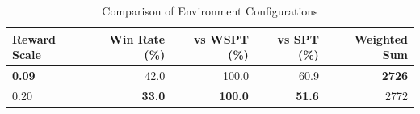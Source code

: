 \begin{table}[htbp]%
\centering%
\begin{tabular}{lrrrr}%
\toprule%
\textbf{Reward Scale}&\textbf{Win Rate (\%)}&\textbf{vs WSPT (\%)}&\textbf{vs SPT (\%)}&\textbf{Weighted Sum}\\%
\midrule%
\textbf{0.09}&42.0&100.0&60.9&\textbf{2726}\\%
0.20&\textbf{33.0}&\textbf{100.0}&\textbf{51.6}&2772\\%
\bottomrule%
\end{tabular}%
\caption{Comparison of Environment Configurations}%
\label{tab:environment}%
\end{table}